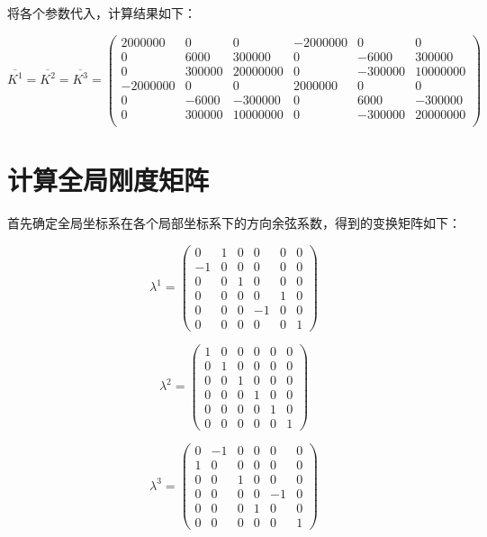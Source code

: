 \documentclass[UTF8]{ctexart}
\begin{document}
将各个参数代入，计算结果如下：

\[ \overline{K^1}=\overline{K^2}=\overline{K^3}= \begin{pmatrix}
2000000 &	0 &	0 &	-2000000 &	0 &	0 \\
0 &	6000 &	300000 &	0 &	-6000 &	300000 \\
0 &	300000 &	20000000 &	0 &	-300000 &	10000000 \\
-2000000 &	0 &	0 &	2000000 &	0 &	0 \\
0 &	-6000 &	-300000 &	0 &	6000 &	-300000 \\
0 &	300000 &	10000000 &	0 &	-300000 &	20000000 \\
\end{pmatrix} \]

\section{计算全局刚度矩阵}

首先确定全局坐标系在各个局部坐标系下的方向余弦系数，得到的变换矩阵如下：

\[ \lambda^1= \begin{pmatrix}
0 &	1 &	0 &	0 &	0 &	0 \\
-1 &	0 &	0 &	0 &	0 &	0 \\
0 &	0 &	1 &	0 &	0 &	0 \\
0 &	0 &	0 &	0 &	1 &	0 \\
0 &	0 &	0 &	-1 &	0 &	0 \\
0 &	0 &	0 &	0 &	0 &	1 
\end{pmatrix} \]

\bigskip

\[ \lambda^2= \begin{pmatrix}
1 &	0 &	0 &	0 &	0 &	0 \\
0 &	1 &	0 &	0 &	0 &	0 \\
0 &	0 &	1 &	0 &	0 &	0 \\
0 &	0 &	0 &	1 &	0 &	0 \\
0 &	0 &	0 &	0 &	1 &	0 \\
0 &	0 &	0 &	0 &	0 &	1 
\end{pmatrix} \]

\bigskip

\[ \lambda^3= \begin{pmatrix}
0 &	-1 &	0 &	0 &	0 &	0 \\
1 &	0 &	0 &	0 &	0 &	0 \\
0 &	0 &	1 &	0 &	0 &	0 \\
0 &	0 &	0 &	0 &	-1 &	0 \\
0 &	0 &	0 &	1 &	0 &	0 \\
0 &	0 &	0 &	0 &	0 &	1 
\end{pmatrix} \]
\end{document}
